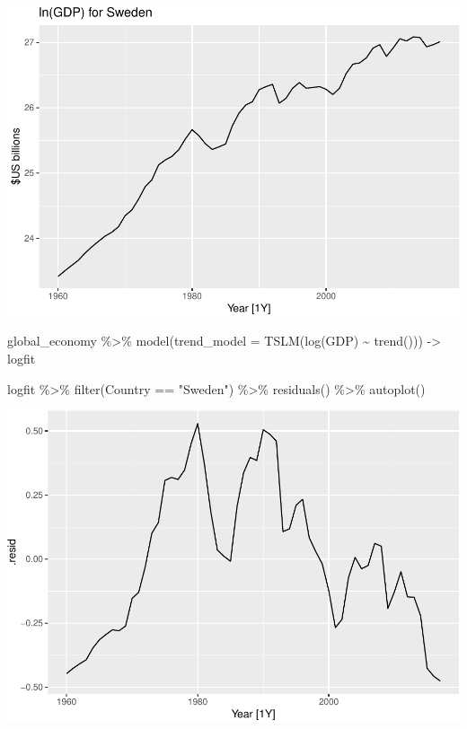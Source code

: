 \documentclass[
]{book}
\newenvironment{Shaded}{\begin{snugshade}}{\end{snugshade}}
\newcommand{\AttributeTok}[1]{\textcolor[rgb]{0.77,0.63,0.00}{#1}}
\newcommand{\FunctionTok}[1]{\textcolor[rgb]{0.00,0.00,0.00}{#1}}
\newcommand{\NormalTok}[1]{#1}
\newcommand{\OtherTok}[1]{\textcolor[rgb]{0.56,0.35,0.01}{#1}}
\newcommand{\SpecialCharTok}[1]{\textcolor[rgb]{0.00,0.00,0.00}{#1}}
\newcommand{\StringTok}[1]{\textcolor[rgb]{0.31,0.60,0.02}{#1}}
\begin{document}
\includegraphics{graphics/unnamed-chunk-28-1.pdf}

\begin{Shaded}
\begin{Highlighting}[]
\NormalTok{global\_economy }\SpecialCharTok{\%\textgreater{}\%}
  \FunctionTok{model}\NormalTok{(}\AttributeTok{trend\_model =} \FunctionTok{TSLM}\NormalTok{(}\FunctionTok{log}\NormalTok{(GDP) }\SpecialCharTok{\textasciitilde{}} \FunctionTok{trend}\NormalTok{())) }\OtherTok{{-}\textgreater{}}\NormalTok{ logfit}
\end{Highlighting}
\end{Shaded}

\begin{Shaded}
\begin{Highlighting}[]
\NormalTok{logfit }\SpecialCharTok{\%\textgreater{}\%} \FunctionTok{filter}\NormalTok{(Country }\SpecialCharTok{==} \StringTok{"Sweden"}\NormalTok{) }\SpecialCharTok{\%\textgreater{}\%} \FunctionTok{residuals}\NormalTok{() }\SpecialCharTok{\%\textgreater{}\%} \FunctionTok{autoplot}\NormalTok{()}
\end{Highlighting}
\end{Shaded}

\includegraphics{graphics/unnamed-chunk-30-1.pdf}
\end{document}
